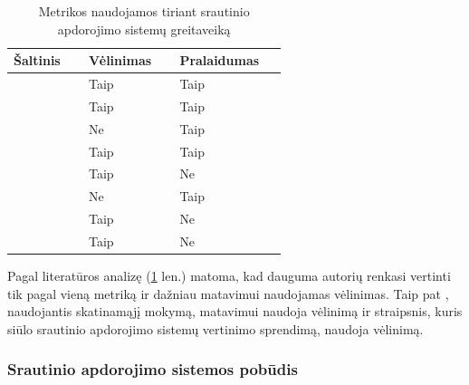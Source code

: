 \documentclass{VUMIFPSbakalaurinis}
\begin{document}
\begin{longtable}{|p{0.2\linewidth}|p{0.2\linewidth}|p{0.2\linewidth}|}
    \caption{Metrikos naudojamos tiriant srautinio apdorojimo sistemų greitaveiką}
    \label{metrikos}\\
    \hline
    \rowcolor[HTML]{C0C0C0} 
    Šaltinis                 & Vėlinimas                        & Pralaidumas                    \\ \hline
    \cite{stonebraker20058}  & Taip                             & Taip                           \\ \hline
    \cite{Karimov2018BenchmarkingDS} & Taip                     & Taip                           \\ \hline
    \cite{hirzel2014catalog} & Ne                               & Taip                           \\ \hline
    \cite{Qian2016Benchmarking} & Taip                          & Taip                           \\ \hline
    \cite{zhang2020heron}    & Taip                             & Ne                             \\ \hline
    \cite{dhalion}           & Ne                               & Taip                           \\ \hline
    \cite{vaquero2018autotuning} & Taip                         & Ne                             \\ \hline
    \cite{Chintapalli2016Benchmarking} & Taip                   & Ne                             \\ \hline
\end{longtable}

Pagal literatūros analizę (\ref{metrikos} len.) matoma, kad dauguma autorių renkasi vertinti tik pagal vieną metriką ir dažniau matavimui naudojamas vėlinimas. Taip pat \cite{vaquero2018autotuning}, naudojantis skatinamąjį mokymą, matavimui naudoja vėlinimą ir \cite{Chintapalli2016Benchmarking} straipsnis, kuris siūlo srautinio apdorojimo sistemų vertinimo sprendimą, naudoja vėlinimą. 

\subsubsection{Srautinio apdorojimo sistemos pobūdis}
\end{document}
